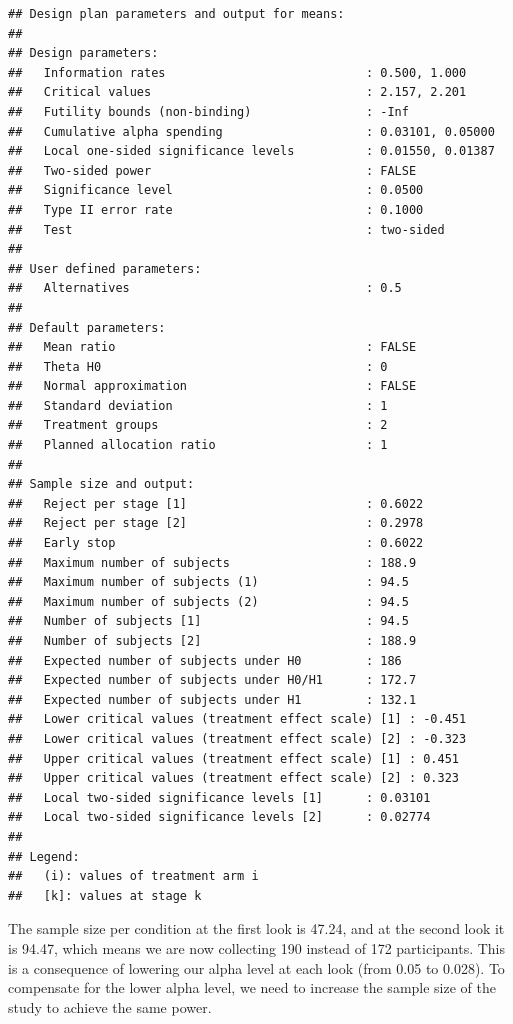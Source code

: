 \documentclass[
  oneside]{book}
\begin{document}
\begin{verbatim}
## Design plan parameters and output for means:
## 
## Design parameters:
##   Information rates                            : 0.500, 1.000 
##   Critical values                              : 2.157, 2.201 
##   Futility bounds (non-binding)                : -Inf 
##   Cumulative alpha spending                    : 0.03101, 0.05000 
##   Local one-sided significance levels          : 0.01550, 0.01387 
##   Two-sided power                              : FALSE 
##   Significance level                           : 0.0500 
##   Type II error rate                           : 0.1000 
##   Test                                         : two-sided 
## 
## User defined parameters:
##   Alternatives                                 : 0.5 
## 
## Default parameters:
##   Mean ratio                                   : FALSE 
##   Theta H0                                     : 0 
##   Normal approximation                         : FALSE 
##   Standard deviation                           : 1 
##   Treatment groups                             : 2 
##   Planned allocation ratio                     : 1 
## 
## Sample size and output:
##   Reject per stage [1]                         : 0.6022 
##   Reject per stage [2]                         : 0.2978 
##   Early stop                                   : 0.6022 
##   Maximum number of subjects                   : 188.9 
##   Maximum number of subjects (1)               : 94.5 
##   Maximum number of subjects (2)               : 94.5 
##   Number of subjects [1]                       : 94.5 
##   Number of subjects [2]                       : 188.9 
##   Expected number of subjects under H0         : 186 
##   Expected number of subjects under H0/H1      : 172.7 
##   Expected number of subjects under H1         : 132.1 
##   Lower critical values (treatment effect scale) [1] : -0.451 
##   Lower critical values (treatment effect scale) [2] : -0.323 
##   Upper critical values (treatment effect scale) [1] : 0.451 
##   Upper critical values (treatment effect scale) [2] : 0.323 
##   Local two-sided significance levels [1]      : 0.03101 
##   Local two-sided significance levels [2]      : 0.02774 
## 
## Legend:
##   (i): values of treatment arm i
##   [k]: values at stage k
\end{verbatim}

The sample size per condition at the first look is 47.24, and at the second look it is 94.47, which means we are now collecting 190 instead of 172 participants. This is a consequence of lowering our alpha level at each look (from 0.05 to 0.028). To compensate for the lower alpha level, we need to increase the sample size of the study to achieve the same power.
\end{document}
